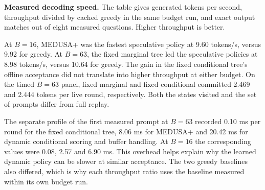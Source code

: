 

\textbf{Measured decoding speed.} The table gives generated tokens per second, throughput divided by cached greedy in the same budget run, and exact output matches out of eight measured questions. Higher throughput is better.


At $B=16$, MEDUSA+ was the fastest speculative policy at 9.60 tokens/s, versus 9.92 for greedy. At $B=63$, the fixed marginal tree led the speculative policies at 8.98 tokens/s, versus 10.64 for greedy. The gain in the fixed conditional tree's offline acceptance did not translate into higher throughput at either budget. On the timed $B=63$ panel, fixed marginal and fixed conditional committed 2.469 and 2.444 tokens per live round, respectively. Both the states visited and the set of prompts differ from full replay.

The separate profile of the first measured prompt at $B=63$ recorded 0.10 ms per round for the fixed conditional tree, 8.06 ms for MEDUSA+ and 20.42 ms for dynamic conditional scoring and buffer handling. At $B=16$ the corresponding values were 0.08, 2.57 and 6.90 ms. This overhead helps explain why the learned dynamic policy can be slower at similar acceptance. The two greedy baselines also differed, which is why each throughput ratio uses the baseline measured within its own budget run.
